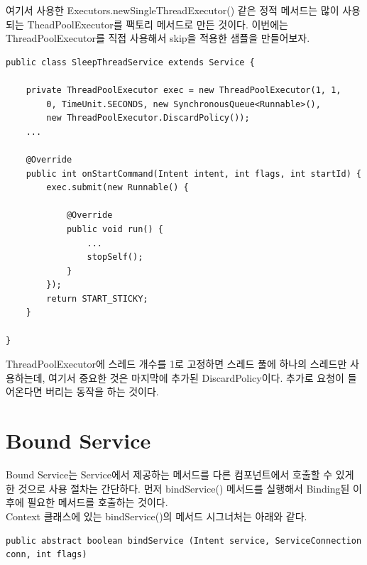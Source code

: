 여기서 사용한 Executors.newSingleThreadExecutor() 같은 정적 메서드는 많이 사용되는 TheadPoolExecutor를 팩토리 메서드로 만든 것이다. 이번에는 ThreadPoolExecutor를 직접 사용해서 skip을 적용한 샘플을 만들어보자.
\begin{lstlisting}[frame=single]
public class SleepThreadService extends Service {
	
	private ThreadPoolExecutor exec = new ThreadPoolExecutor(1, 1, 
		0, TimeUnit.SECONDS, new SynchronousQueue<Runnable>(), 
		new ThreadPoolExecutor.DiscardPolicy());	
	...
		
	@Override
	public int onStartCommand(Intent intent, int flags, int startId) {
		exec.submit(new Runnable() {

			@Override
			public void run() {
				...
				stopSelf();
			}
		});
		return START_STICKY;
	}

} 
\end{lstlisting}
ThreadPoolExecutor에 스레드 개수를 1로 고정하면 스레드 풀에 하나의 스레드만 사용하는데, 여기서 중요한 것은 마지막에 추가된 DiscardPolicy이다. 추가로 요청이 들어온다면 버리는 동작을 하는 것이다.

\section{Bound Service}
Bound Service는 Service에서 제공하는 메서드를 다른 컴포넌트에서 호출할 수 있게 한 것으로 사용 절차는 간단하다. 
먼저 bindService() 메서드를 실행해서 Binding된 이후에 필요한 메서드를 호출하는 것이다.\\

Context 클래스에 있는 bindService()의 메서드 시그너처는 아래와 같다.
\begin{lstlisting}[frame=single]
public abstract boolean bindService (Intent service, ServiceConnection conn, int flags)
\end{lstlisting}

